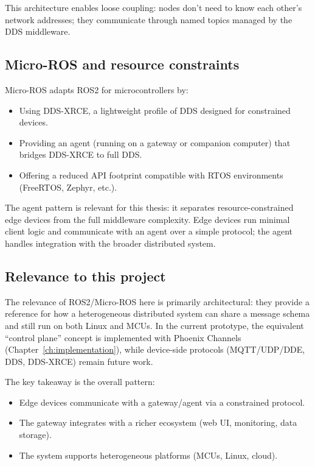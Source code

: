 This architecture enables loose coupling: nodes don't need to know each other's network addresses; they communicate through named topics managed by the DDS middleware.


\subsection{Micro-ROS and resource constraints}

Micro-ROS adapts ROS2 for microcontrollers by:
\begin{itemize}
  \item Using DDS-XRCE, a lightweight profile of DDS designed for constrained devices.
  \item Providing an agent (running on a gateway or companion computer) that bridges DDS-XRCE to full DDS.
  \item Offering a reduced API footprint compatible with RTOS environments (FreeRTOS, Zephyr, etc.).
\end{itemize}

The agent pattern is relevant for this thesis: it separates resource-constrained edge devices from the full middleware complexity.
Edge devices run minimal client logic and communicate with an agent over a simple protocol; the agent handles integration with the broader distributed system.

\subsection{Relevance to this project}

The relevance of ROS2/Micro-ROS here is primarily architectural: they provide a reference for how a heterogeneous distributed system can share a message schema and still run on both Linux and MCUs.
In the current prototype, the equivalent ``control plane'' concept is implemented with Phoenix Channels (Chapter~\ref{ch:implementation}), while device-side protocols (MQTT/UDP/DDE, DDS, DDS-XRCE) remain future work.

The key takeaway is the overall pattern:
\begin{itemize}
  \item Edge devices communicate with a gateway/agent via a constrained protocol.
  \item The gateway integrates with a richer ecosystem (web UI, monitoring, data storage).
  \item The system supports heterogeneous platforms (MCUs, Linux, cloud).
\end{itemize}

